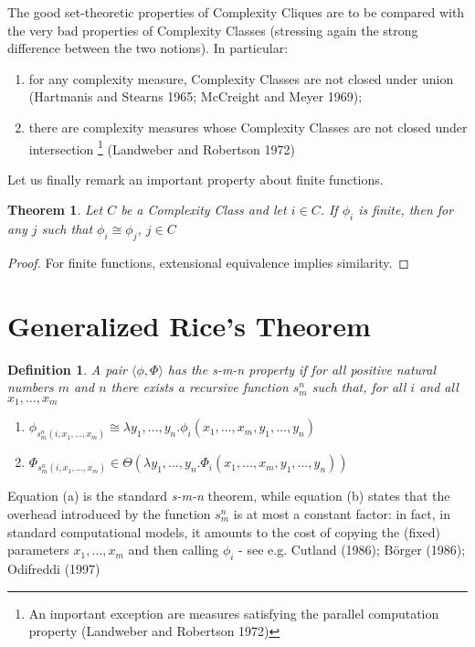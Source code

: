 \documentclass[10pt, a4paper, oneside, titlepage, draft]{article}
\newtheorem{definition}[shrd]{Definition}
\newtheorem{theorem}[shrd]{Theorem}
\begin{document}
The good set-theoretic properties of Complexity Cliques are to be compared with the very bad properties of Complexity Classes (stressing again the strong difference between the two notions). In particular:
\begin{enumerate}
    \item for any complexity measure, Complexity Classes are not closed under union (Hartmanis and Stearns 1965; McCreight and Meyer 1969);
    \item there are complexity measures whose Complexity Classes are not closed under intersection \footnote{An important exception are measures satisfying the parallel computation
    property (Landweber and Robertson 1972)} (Landweber and Robertson 1972)
\end{enumerate}

Let us finally remark an important property about finite functions.

\begin{theorem}
    Let $C$ be a Complexity Class and let $i \in C$. If $\phi_i$ is finite, then for any $j$ such that $\phi_i \cong \phi_j$, $j \in C$
\end{theorem}

\begin{proof}
    For finite functions, extensional equivalence implies similarity.
\end{proof}

\section{Generalized Rice's Theorem}

\begin{definition}
    A pair $\langle \phi, \Phi \rangle$ has the \emph{s-m-n property} if for all positive natural numbers $m$ and $n$ there exists a recursive function $s_m^n$ such that, for all $i$ and all $x_1, \dots, x_m$ 
    \begin{enumerate}[label=(\alph*)]
        \item $ \phi_{s_m^n (i,x_1,\dots,x_m)} \cong \lambda y_1,\dots,y_n . \phi_i (x_1,\dots,x_m,y_1,\dots,y_n)  $
        \item $ \Phi_{s_m^n (i,x_1,\dots,x_m)} \in  \Theta(\lambda y_1,\dots,y_n . \Phi_i (x_1,\dots,x_m,y_1,\dots,y_n))  $
    \end{enumerate}
\end{definition}

Equation (a) is the standard \emph{s-m-n} theorem, while equation (b) states that the overhead introduced by the function $s_m^n$ is at most a constant factor: in fact, in standard computational models, it amounts to the cost of copying the (fixed) parameters $x_1,\dots,x_m$ and then calling $\phi_i$ - see e.g. Cutland (1986); Börger (1986); Odifreddi (1997)
\end{document}

